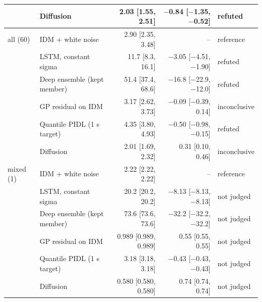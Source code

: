 \begin{table}[htbp]
\begin{tabular}{llrrl}
 & Diffusion & 2.03 [1.55, 2.51] & $-$0.84 [$-$1.35, $-$0.52] & refuted \\
\midrule
all (60) & IDM + white noise & 2.90 [2.35, 3.48] & -- & reference \\
 & LSTM, constant sigma & 11.7 [8.3, 16.1] & $-$3.05 [$-$4.51, $-$1.90] & refuted \\
 & Deep ensemble (kept member) & 51.4 [37.4, 68.6] & $-$16.8 [$-$22.9, $-$12.0] & refuted \\
 & GP residual on IDM & 3.17 [2.62, 3.73] & $-$0.09 [$-$0.39, 0.14] & inconclusive \\
 & Quantile PIDL (1 s target) & 4.35 [3.80, 4.93] & $-$0.50 [$-$0.98, $-$0.15] & refuted \\
 & Diffusion & 2.01 [1.69, 2.32] & 0.31 [0.10, 0.46] & inconclusive \\
\midrule
mixed (1) & IDM + white noise & 2.22 [2.22, 2.22] & -- & reference \\
 & LSTM, constant sigma & 20.2 [20.2, 20.2] & $-$8.13 [$-$8.13, $-$8.13] & not judged \\
 & Deep ensemble (kept member) & 73.6 [73.6, 73.6] & $-$32.2 [$-$32.2, $-$32.2] & not judged \\
 & GP residual on IDM & 0.989 [0.989, 0.989] & 0.55 [0.55, 0.55] & not judged \\
 & Quantile PIDL (1 s target) & 3.18 [3.18, 3.18] & $-$0.43 [$-$0.43, $-$0.43] & not judged \\
 & Diffusion & 0.580 [0.580, 0.580] & 0.74 [0.74, 0.74] & not judged \\
\bottomrule
\end{tabular}
\end{table}
